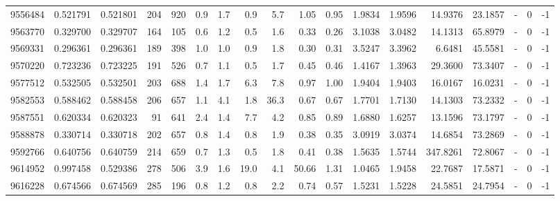\begin{tabular}{rrrrrrrrrrrrrrrlrr}
   9556484 & 0.521791 &   0.521801 &  204 &  920 &      0.9 &      1.7 &     0.9 &      5.7 &       1.05 &        0.95 &  1.9834 &  1.9596 &   14.9376 &   23.1857 &             - &        0 &         -1 \\
   9563770 & 0.329700 &   0.329707 &  164 &  105 &      0.6 &      1.2 &     0.5 &      1.6 &       0.33 &        0.26 &  3.1038 &  3.0482 &   14.1313 &   65.8979 &             - &        0 &         -1 \\
   9569331 & 0.296361 &   0.296361 &  189 &  398 &      1.0 &      1.0 &     0.9 &      1.8 &       0.30 &        0.31 &  3.5247 &  3.3962 &    6.6481 &   45.5581 &             - &        0 &         -1 \\
   9570220 & 0.723236 &   0.723225 &  191 &  526 &      0.7 &      1.1 &     0.5 &      1.7 &       0.45 &        0.46 &  1.4167 &  1.3963 &   29.3600 &   73.3407 &             - &        0 &         -1 \\
   9577512 & 0.532505 &   0.532501 &  203 &  688 &      1.4 &      1.7 &     6.3 &      7.8 &       0.97 &        1.00 &  1.9404 &  1.9403 &   16.0167 &   16.0231 &             - &        0 &         -1 \\
   9582553 & 0.588462 &   0.588458 &  206 &  657 &      1.1 &      4.1 &     1.8 &     36.3 &       0.67 &        0.67 &  1.7701 &  1.7130 &   14.1303 &   73.2332 &             - &        0 &         -1 \\
   9587551 & 0.620334 &   0.620323 &   91 &  641 &      2.4 &      1.4 &     7.7 &      4.2 &       0.85 &        0.89 &  1.6880 &  1.6257 &   13.1596 &   73.1797 &             - &        0 &         -1 \\
   9588878 & 0.330714 &   0.330718 &  202 &  657 &      0.8 &      1.4 &     0.8 &      1.9 &       0.38 &        0.35 &  3.0919 &  3.0374 &   14.6854 &   73.2869 &             - &        0 &         -1 \\
   9592766 & 0.640756 &   0.640759 &  214 &  659 &      0.7 &      1.3 &     0.5 &      1.8 &       0.41 &        0.38 &  1.5635 &  1.5744 &  347.8261 &   72.8067 &             - &        0 &         -1 \\
   9614952 & 0.997458 &   0.529386 &  278 &  506 &      3.9 &      1.6 &    19.0 &      4.1 &      50.66 &        1.31 &  1.0465 &  1.9458 &   22.7687 &   17.5871 &             - &        0 &         -1 \\
   9616228 & 0.674566 &   0.674569 &  285 &  196 &      0.8 &      1.2 &     0.8 &      2.2 &       0.74 &        0.57 &  1.5231 &  1.5228 &   24.5851 &   24.7954 &             - &        0 &         -1 \\

\end{tabular}
